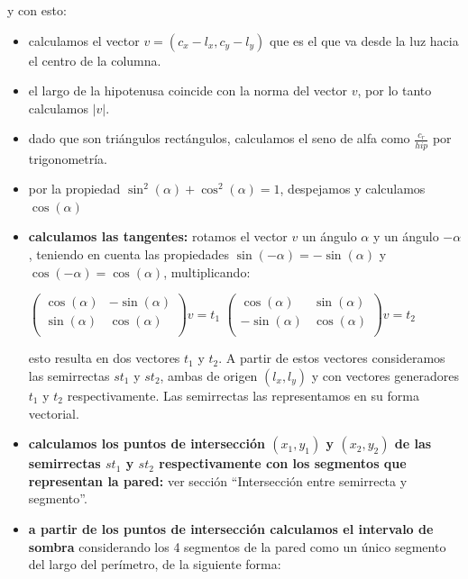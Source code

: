 y con esto:

\begin{itemize}
\item calculamos el vector $v = (c_x - l_x, c_y - l_y)$ que es el que va desde la luz hacia
el centro de la columna.
\item el largo de la hipotenusa coincide con la norma del vector $v$, por lo tanto calculamos $|v|$.
\item dado que son triángulos rectángulos, calculamos el seno de alfa como
$\displaystyle\frac{c_r}{hip}$ por trigonometría.
\item por la propiedad $\sin^2(\alpha) + \cos^2(\alpha) = 1$, despejamos y calculamos $\cos(\alpha)$
\item \textbf{calculamos las tangentes:} rotamos el vector $v$ un ángulo $\alpha$ y un ángulo
$-\alpha$, teniendo en cuenta las propiedades $\sin(-\alpha) = -\sin(\alpha)$ y
$\cos(-\alpha) = \cos(\alpha)$, multiplicando:

\vspace{0.2cm}
\begin{center}
$\left(
\begin{array}{cc}
\cos(\alpha) & -\sin(\alpha) \\
\sin(\alpha) & \cos(\alpha) \\
\end{array}
\right)
v = t_1$
\hspace{1cm}
$\left(
\begin{array}{cc}
\cos(\alpha) & \sin(\alpha) \\
-\sin(\alpha) & \cos(\alpha) \\
\end{array}
\right)  
v = t_2$
\end{center}
\vspace{0.2cm}

esto resulta en dos vectores $t_1$ y $t_2$. A partir de estos vectores consideramos las semirrectas
$st_1$ y $st_2$, ambas de origen $(l_x, l_y)$ y con vectores generadores $t_1$ y $t_2$
respectivamente. Las semirrectas las representamos en su forma vectorial.
\item \textbf{calculamos los puntos de intersección $(x_1, y_1)$ y $(x_2, y_2)$ de las semirrectas
$st_1$ y $st_2$ respectivamente con los segmentos que representan la pared:} ver sección
``Intersección entre semirrecta y segmento''.
\item \textbf{a partir de los puntos de intersección calculamos el intervalo de sombra}
considerando los 4 segmentos de la pared como un único segmento del largo del perímetro,
de la siguiente forma:


\end{itemize}
